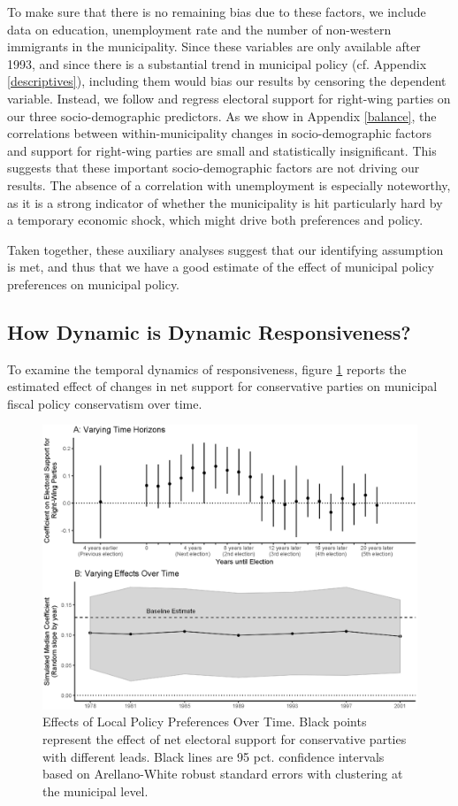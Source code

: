\documentclass[a4paper,12pt]{article}
\begin{document}
To make sure that there is no remaining bias due to these factors, we include data on education, unemployment rate and the number of non-western immigrants in the municipality. Since these variables are only available after 1993, and since there is a substantial trend in municipal policy (cf. Appendix \ref{descriptives}), including them would bias our results by censoring the dependent variable. Instead, we follow \citep{pei2018poorly} and regress electoral support for right-wing parties on our three socio-demographic predictors. As we show in Appendix \ref{balance}, the correlations between within-municipality changes in socio-demographic factors and support for right-wing parties are small and statistically insignificant. This suggests that these important socio-demographic factors are not driving our results. The absence of a correlation with unemployment is especially noteworthy, as it is a strong indicator of whether the municipality is hit particularly hard by a temporary economic shock, which might drive both preferences and policy.

Taken together, these auxiliary analyses suggest that our identifying assumption is met, and thus that we have a good estimate of the effect of municipal policy preferences on municipal policy.

\subsection*{How Dynamic is Dynamic Responsiveness?}

To examine the temporal dynamics of responsiveness, figure \ref{fig:LongRun} reports the estimated effect of changes in net support for conservative parties on  municipal fiscal policy conservatism over time.

\begin{figure}[htbp]
	\centering
	\includegraphics[scale = .6]{EffectsVsTime.eps}
	\caption{Effects of Local Policy Preferences Over Time. Black points represent the effect of net electoral support for conservative parties with different leads. Black lines are 95 pct. confidence intervals based on Arellano-White robust standard errors with clustering at the municipal level.}
	\label{fig:LongRun}
\end{figure}
\end{document}
